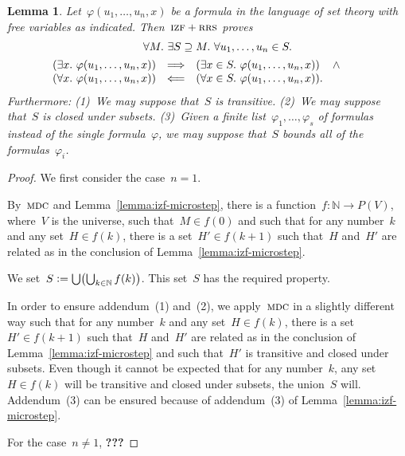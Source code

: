 \documentclass[oneside,reqno]{amsart}
\theoremstyle{definition}
\theoremstyle{plain}
\newtheorem{lemma}[defn]{Lemma}
\theoremstyle{remark}
\newcommand{\NN}{\mathbb{N}}
\newcommand{\defeq}{\vcentcolon=}
\renewcommand{\_}{\mathpunct{.}\,}
\newcommand{\?}{\,{:}\,}
\newcommand{\IZF}{\textsc{izf}}
\newcommand{\RRS}{\textsc{rrs}}
\newcommand{\MDC}{\textsc{mdc}}
\begin{document}
\begin{lemma}\label{lemma:izf-smallstep}
Let~$\varphi(u_1,\ldots,u_n,x)$ be a formula in the language of set
theory with free variables as indicated. Then~$\IZF+\RRS$ proves
\begin{multline*}
  {\qquad}\forall M\_
  \exists S \supseteq M\_
  \forall u_1,\ldots,u_n \in S\_ \\
  \begin{array}{@{}rcl@{}}
  (\exists x\_ \varphi(u_1,\ldots,u_n,x)) &\Longrightarrow&
  (\exists x \in S\_ \varphi(u_1,\ldots,u_n,x)) \quad\mathop{\wedge} \\
  (\forall x\_ \varphi(u_1,\ldots,u_n,x)) &\Longleftarrow&
  (\forall x \in S\_ \varphi(u_1,\ldots,u_n,x)).\end{array}
  {\qquad}
\end{multline*}
Furthermore: (1)~We may suppose that~$S$ is transitive. (2)~We may suppose
that~$S$ is closed under subsets. (3)~Given a finite
list~$\varphi_1,\ldots,\varphi_s$ of formulas instead of the single
formula~$\varphi$, we may suppose that~$S$ bounds all of the
formulas~$\varphi_i$.
\end{lemma}

\begin{proof}We first consider the case~$n = 1$.

By~$\MDC$ and Lemma~\ref{lemma:izf-microstep}, there is a
function~$f : \NN \to P(V)$, where~$V$ is the universe, such that~$M \in
f(0)$ and such that for any number~$k$ and any set~$H \in f(k)$, there is a
set~$H' \in f(k+1)$ such that~$H$ and~$H'$ are related as in the conclusion of
Lemma~\ref{lemma:izf-microstep}.

We set~$S \defeq \bigcup \bigl(\bigcup_{k \in \NN} f(k)\bigr)$. This set~$S$
has the required property.

In order to ensure addendum~(1) and~(2), we apply~$\MDC$ in a slightly
different way such that for any number~$k$ and any set~$H \in f(k)$, there is a
set~$H' \in f(k+1)$ such that~$H$ and~$H'$ are related as in the conclusion of
Lemma~\ref{lemma:izf-microstep} and such that~$H'$ is transitive and closed
under subsets. Even though it cannot be expected that for any number~$k$,
any set~$H \in f(k)$ will be transitive and closed under subsets, the union~$S$
will. Addendum~(3) can be ensured because of addendum~(3) of
Lemma~\ref{lemma:izf-microstep}.

For the case~$n \neq 1$, \textbf{???}
\end{proof}
\end{document}
